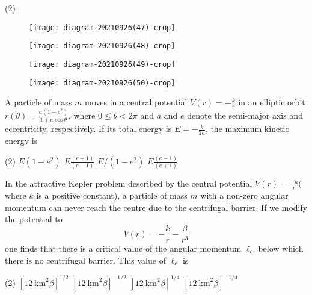 \begin{enumerate}
\begin{minipage}{\textwidth}
\end{minipage}
\begin{tasks}(2)
	\task[\textbf{A.}]\begin{figure}[H]
		\centering
		\texttt{[image: diagram-20210926(47)-crop]}
	\end{figure}
	\task[\textbf{B.}]\begin{figure}[H]
		\centering
		\texttt{[image: diagram-20210926(48)-crop]}
	\end{figure}
	\task[\textbf{C.}]\begin{figure}[H]
		\centering
		\texttt{[image: diagram-20210926(49)-crop]}
	\end{figure}
	\task[\textbf{D.}]\begin{figure}[H]
		\centering
		\texttt{[image: diagram-20210926(50)-crop]}
	\end{figure}
\end{tasks}
\begin{minipage}{\textwidth}
	\item A particle of mass $m$ moves in a central potential $V(r)=-\frac{k}{r}$ in an elliptic orbit $r(\theta)=\frac{a\left(1-e^{2}\right)}{1+e \cos \theta}$, where $0 \leq \theta<2 \pi$ and $a$ and $e$ denote the semi-major axis and eccentricity, respectively. If its total energy is $E=-\frac{k}{2 a}$, the maximum kinetic energy is
\end{minipage}
\begin{tasks}(2)
	\task[\textbf{A.}] $E\left(1-e^{2}\right)$
	\task[\textbf{B.}]$E \frac{(e+1)}{(e-1)}$
	\task[\textbf{C.}]$E /\left(1-e^{2}\right)$
	\task[\textbf{D.}]$E \frac{(e-1)}{(e+1)}$
\end{tasks}
\begin{minipage}{\textwidth}
	\item In the attractive Kepler problem described by the central potential $V(r)=\frac{-k}{r}($ where $k$ is a positive constant), a particle of mass $m$ with a non-zero angular momentum can never reach the centre due to the centrifugal barrier. If we modify the potential to
	$$
	V(r)=-\frac{k}{r}-\frac{\beta}{r^{3}}
	$$
	one finds that there is a critical value of the angular momentum $\ell_{c}$ below which there is no centrifugal barrier. This value of $\ell_{c}$ is
\end{minipage}
\begin{tasks}(2)
	\task[\textbf{A.}] $\left[12 \mathrm{~km}^{2} \beta\right]^{1 / 2}$
	\task[\textbf{B.}]$\left[12 \mathrm{~km}^{2} \beta\right]^{-1 / 2}$
	\task[\textbf{C.}]$\left[12 \mathrm{~km}^{2} \beta\right]^{1 / 4}$
	\task[\textbf{D.}]$\left[12 \mathrm{~km}^{2} \beta\right]^{-1 / 4}$
\end{tasks}
 \end{enumerate}

